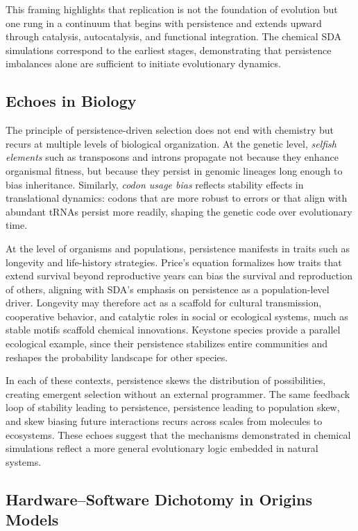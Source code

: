 \documentclass[life,article,submit,pdftex,moreauthors]{Definitions/mdpi}
\begin{document}
This framing highlights that replication is not the foundation of evolution but one rung in a continuum that begins with persistence and extends upward through catalysis, autocatalysis, and functional integration. The chemical SDA simulations correspond to the earliest stages, demonstrating that persistence imbalances alone are sufficient to initiate evolutionary dynamics.  

\subsection{Echoes in Biology}  

The principle of persistence-driven selection does not end with chemistry but recurs at multiple levels of biological organization. At the genetic level, \textit{selfish elements} such as transposons and introns propagate not because they enhance organismal fitness, but because they persist in genomic lineages long enough to bias inheritance. Similarly, \textit{codon usage bias} reflects stability effects in translational dynamics: codons that are more robust to errors or that align with abundant tRNAs persist more readily, shaping the genetic code over evolutionary time.  

At the level of organisms and populations, persistence manifests in traits such as longevity and life-history strategies. Price’s equation formalizes how traits that extend survival beyond reproductive years can bias the survival and reproduction of others, aligning with SDA’s emphasis on persistence as a population-level driver. Longevity may therefore act as a scaffold for cultural transmission, cooperative behavior, and catalytic roles in social or ecological systems, much as stable motifs scaffold chemical innovations. Keystone species provide a parallel ecological example, since their persistence stabilizes entire communities and reshapes the probability landscape for other species.  

In each of these contexts, persistence skews the distribution of possibilities, creating emergent selection without an external programmer. The same feedback loop of stability leading to persistence, persistence leading to population skew, and skew biasing future interactions recurs across scales from molecules to ecosystems. These echoes suggest that the mechanisms demonstrated in chemical simulations reflect a more general evolutionary logic embedded in natural systems.



\subsection{Hardware--Software Dichotomy in Origins Models}
\end{document}
